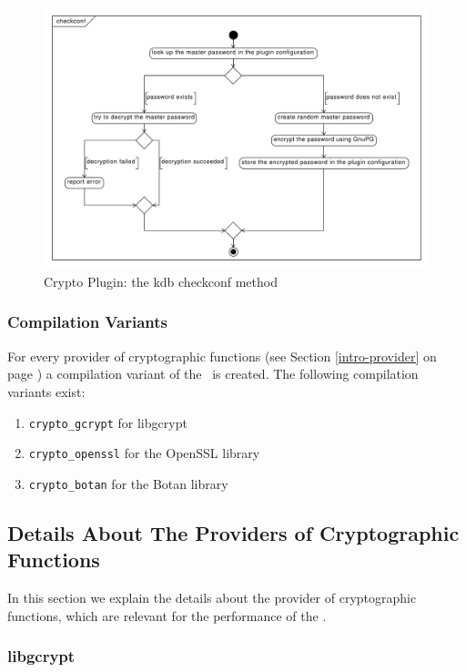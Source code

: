 \begin{figure}[h]
\center
\caption{Crypto Plugin: the kdb checkconf method}
\label{impl_checkconf}
\includegraphics[width=15.0cm]{umlet-figures/impl_checkconf.pdf}
\end{figure}

\subsubsection{Compilation Variants}

For every provider of cryptographic functions (see Section \ref{intro-provider} on page \pageref{intro-provider}) a compilation variant of the \crypto ~is created.
The following compilation variants exist:
\begin{enumerate}
	\item \texttt{crypto\_gcrypt} for libgcrypt
	\item \texttt{crypto\_openssl} for the OpenSSL library
	\item \texttt{crypto\_botan} for the Botan library
\end{enumerate}

\subsection{Details About The Providers of Cryptographic Functions}
\label{impl-crypto-details}

In this section we explain the details about the provider of cryptographic functions, which are relevant for the performance of the \crypto.

\subsubsection{libgcrypt}

